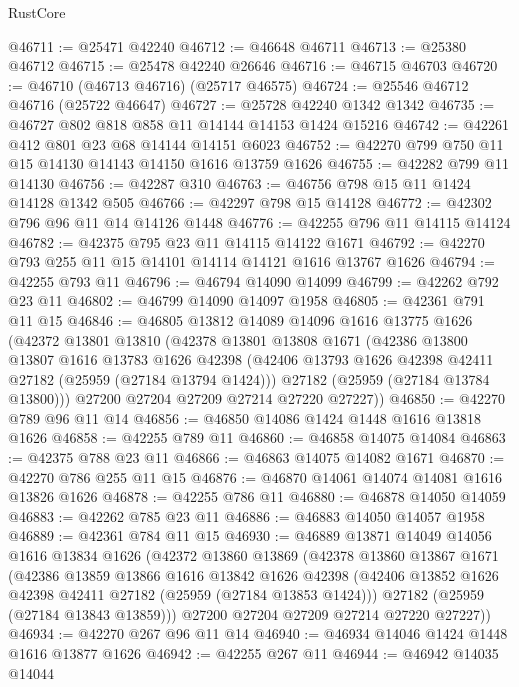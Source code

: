 \begin{lexlean}{RustCore}
\begin{coremodule}
@46711 := @25471 @42240
@46712 := @46648 @46711
@46713 := @25380 @46712
@46715 := @25478 @42240 @26646
@46716 := @46715 @46703
@46720 := @46710 (@46713 @46716) (@25717 @46575)
@46724 := @25546 @46712 @46716 (@25722 @46647)
@46727 := @25728 @42240 @1342 @1342
@46735 := @46727 @802 @818 @858 @11 @14144 @14153 @1424 @15216
@46742 := @42261 @412 @801 @23 @68 @14144 @14151 @6023
@46752 := @42270 @799 @750 @11 @15 @14130 @14143 @14150 @1616 @13759 @1626
@46755 := @42282 @799 @11 @14130
@46756 := @42287 @310
@46763 := @46756 @798 @15 @11 @1424 @14128 @1342 @505
@46766 := @42297 @798 @15 @14128
@46772 := @42302 @796 @96 @11 @14 @14126 @1448
@46776 := @42255 @796 @11 @14115 @14124
@46782 := @42375 @795 @23 @11 @14115 @14122 @1671
@46792 := @42270 @793 @255 @11 @15 @14101 @14114 @14121 @1616 @13767 @1626
@46794 := @42255 @793 @11
@46796 := @46794 @14090 @14099
@46799 := @42262 @792 @23 @11
@46802 := @46799 @14090 @14097 @1958
@46805 := @42361 @791 @11 @15
@46846 := @46805
    @13812
    @14089
    @14096
    @1616
    @13775
    @1626
    (@42372
      @13801
      @13810
      (@42378
        @13801
        @13808
        @1671
        (@42386
          @13800
          @13807
          @1616
          @13783
          @1626
          @42398
          (@42406 @13793 @1626 @42398 @42411 @27182 (@25959 (@27184 @13794 @1424)))
          @27182
          (@25959 (@27184 @13784 @13800)))
        @27200
        @27204
        @27209
        @27214
        @27220
        @27227))
@46850 := @42270 @789 @96 @11 @14
@46856 := @46850 @14086 @1424 @1448 @1616 @13818 @1626
@46858 := @42255 @789 @11
@46860 := @46858 @14075 @14084
@46863 := @42375 @788 @23 @11
@46866 := @46863 @14075 @14082 @1671
@46870 := @42270 @786 @255 @11 @15
@46876 := @46870 @14061 @14074 @14081 @1616 @13826 @1626
@46878 := @42255 @786 @11
@46880 := @46878 @14050 @14059
@46883 := @42262 @785 @23 @11
@46886 := @46883 @14050 @14057 @1958
@46889 := @42361 @784 @11 @15
@46930 := @46889
    @13871
    @14049
    @14056
    @1616
    @13834
    @1626
    (@42372
      @13860
      @13869
      (@42378
        @13860
        @13867
        @1671
        (@42386
          @13859
          @13866
          @1616
          @13842
          @1626
          @42398
          (@42406 @13852 @1626 @42398 @42411 @27182 (@25959 (@27184 @13853 @1424)))
          @27182
          (@25959 (@27184 @13843 @13859)))
        @27200
        @27204
        @27209
        @27214
        @27220
        @27227))
@46934 := @42270 @267 @96 @11 @14
@46940 := @46934 @14046 @1424 @1448 @1616 @13877 @1626
@46942 := @42255 @267 @11
@46944 := @46942 @14035 @14044

\end{coremodule}
\end{lexlean}
